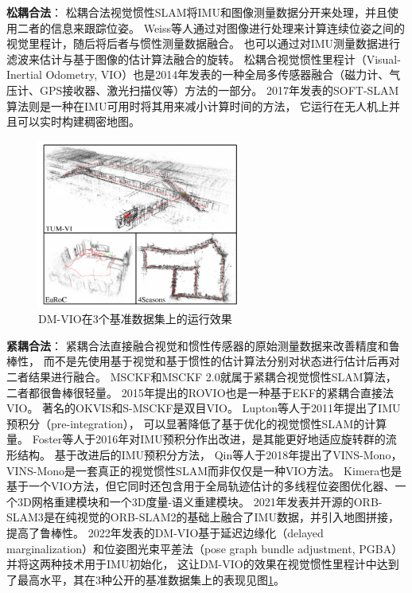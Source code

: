 \textbf{松耦合法}：
松耦合法视觉惯性SLAM将IMU和图像测量数据分开来处理，并且使用二者的信息来跟踪位姿。
Weiss等人\cite{weiss2012real}通过对图像进行处理来计算连续位姿之间的视觉里程计，随后将后者与惯性测量数据融合。
也可以通过对IMU测量数据进行滤波来估计与基于图像的估计算法融合的旋转。
松耦合视觉惯性里程计（Visual-Inertial Odometry, VIO）也是2014年发表的一种全局多传感器融合（磁力计、气压计、GPS接收器、激光扫描仪等）方法\cite{shen2014multi}的一部分。
2017年发表的SOFT-SLAM\cite{cvivsic2018soft}算法则是一种在IMU可用时将其用来减小计算时间的方法，
它运行在无人机上并且可以实时构建稠密地图。

\begin{figure}[htbp]
    \centering
    \includegraphics[width = 0.6\textwidth]{figures/dm_vio_demo.png}
    \caption{DM-VIO在3个基准数据集上的运行效果\cite{von2022dm}}
    \label{fig:dm_vio_demo}
\end{figure}

\textbf{紧耦合法}：
紧耦合法直接融合视觉和惯性传感器的原始测量数据来改善精度和鲁棒性，
而不是先使用基于视觉和基于惯性的估计算法分别对状态进行估计后再对二者结果进行融合。
MSCKF\cite{mourikis2007multi}和MSCKF 2.0\cite{li2013high}就属于紧耦合视觉惯性SLAM算法，二者都很鲁棒很轻量。
2015年提出的ROVIO\cite{bloesch2015robust}也是一种基于EKF的紧耦合直接法VIO。
著名的OKVIS\cite{leutenegger2015keyframe}和S-MSCKF\cite{sun2018robust}是双目VIO。
Lupton等人于2011年提出了IMU预积分（pre-integration）\cite{lupton2011visual}，
可以显著降低了基于优化的视觉惯性SLAM的计算量。
Foster等人于2016年对IMU预积分作出改进\cite{forster2016manifold}，是其能更好地适应旋转群的流形结构。
基于改进后的IMU预积分方法，
Qin等人于2018年提出了VINS-Mono\cite{qin2018vins}，VINS-Mono是一套真正的视觉惯性SLAM而非仅仅是一种VIO方法。
Kimera也是基于一个VIO方法，但它同时还包含用于全局轨迹估计的多线程位姿图优化器、一个3D网格重建模块和一个3D度量-语义重建模块。
2021年发表并开源的ORB-SLAM3\cite{campos2021orb}是在纯视觉的ORB-SLAM2\cite{mur2017orb}的基础上融合了IMU数据，并引入地图拼接，提高了鲁棒性。
2022年发表的DM-VIO\cite{von2022dm}基于延迟边缘化（delayed marginalization）和位姿图光束平差法（pose graph bundle adjustment, PGBA）并将这两种技术用于IMU初始化，
这让DM-VIO的效果在视觉惯性里程计中达到了最高水平，其在3种公开的基准数据集上的表现见图\ref{fig:dm_vio_demo}。


